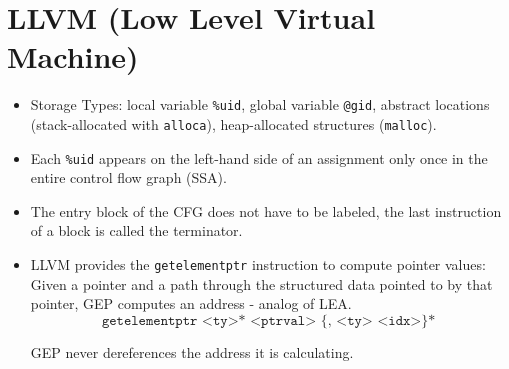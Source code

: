 \section*{LLVM (Low Level Virtual Machine)}

\begin{itemize}
	\item Storage Types: local variable \texttt{\%uid}, global variable \texttt{@gid}, abstract locations (stack-allocated with \texttt{alloca}), heap-allocated structures (\texttt{malloc}).
	
	\item Each \texttt{\%uid} appears on the left-hand side of an assignment only once in the entire control flow graph (SSA).
	
	\item The entry block of the CFG does not have to be labeled, the last instruction of a block is called the terminator.
	
	\item LLVM provides the \texttt{getelementptr} instruction to compute pointer values: Given a pointer and a path through the structured data pointed to by that pointer, GEP computes an address - analog of LEA.
		$$\texttt{getelementptr <ty>* <ptrval> \{, <ty> <idx>\}* }$$
		
		GEP never dereferences the address it is calculating.
	
	
\end{itemize}
